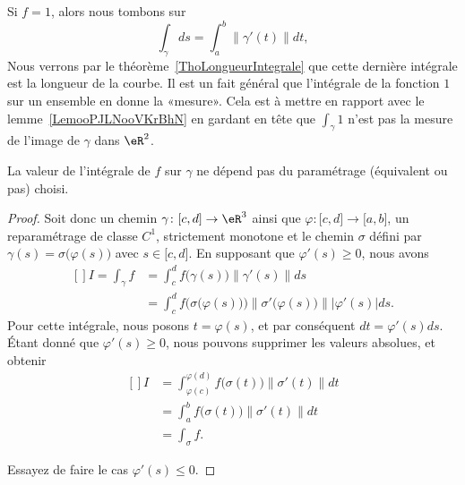 \begin{remark}
	Si \( f=1\), alors nous tombons sur
	\begin{equation}
		\int_{\gamma}ds=\int_a^b\| \gamma'(t) \|dt,
	\end{equation}
	Nous verrons par le théorème~\ref{ThoLongueurIntegrale} que cette dernière intégrale est la longueur de la courbe. Il est un fait général que l'intégrale de la fonction \( 1\) sur un ensemble en donne la «mesure».
	Cela est à mettre en rapport avec le lemme~\ref{LemooPJLNooVKrBhN} en gardant en tête que \( \int_{\gamma}1\) n'est pas la mesure de l'image de \( \gamma\) dans \( \eR^2\).
\end{remark}

\begin{proposition}
	La valeur de l'intégrale de \( f\) sur \( \gamma\) ne dépend pas du paramétrage (équivalent ou pas) choisi.
\end{proposition}

\begin{proof}
	Soit donc un chemin \( \gamma\colon \mathopen[ c , d \mathclose]\to \eR^3\) ainsi que \( \varphi\colon \mathopen[ c , d \mathclose]\to \mathopen[ a , b \mathclose]\), un reparamétrage de classe \( C^1\), strictement monotone et le chemin \( \sigma\) défini par \( \gamma(s)=\sigma\big( \varphi(s) \big)\) avec \( s\in\mathopen[ c , d \mathclose]\). En supposant que \( \varphi'(s)\geq 0\), nous avons
	\begin{equation}
		\begin{aligned}[]
			I=\int_{\gamma}f & =\int_c^df\big( \gamma(s) \big)\| \gamma'(s) \|ds                                                       \\
			                 & =\int_c^df\Big( \sigma\big( \varphi(s) \big) \Big)\| \sigma'\big( \varphi(s) \big) \| |\varphi'(s) |ds.
		\end{aligned}
	\end{equation}
	Pour cette intégrale, nous posons \( t=\varphi(s)\), et par conséquent \( dt=\varphi'(s)ds\). Étant donné que \( \varphi'(s)\geq 0\), nous pouvons supprimer les valeurs absolues, et obtenir
	\begin{equation}
		\begin{aligned}[]
			I & =\int_{\varphi(c)}^{\varphi(d)}f\big( \sigma(t) \big)\| \sigma'(t) \|dt \\
			  & =\int_a^bf\big( \sigma(t) \big)\| \sigma'(t) \|dt                       \\
			  & =\int_{\sigma}f.
		\end{aligned}
	\end{equation}

	Essayez de faire le cas \( \varphi'(s)\leq 0\).
\end{proof}

